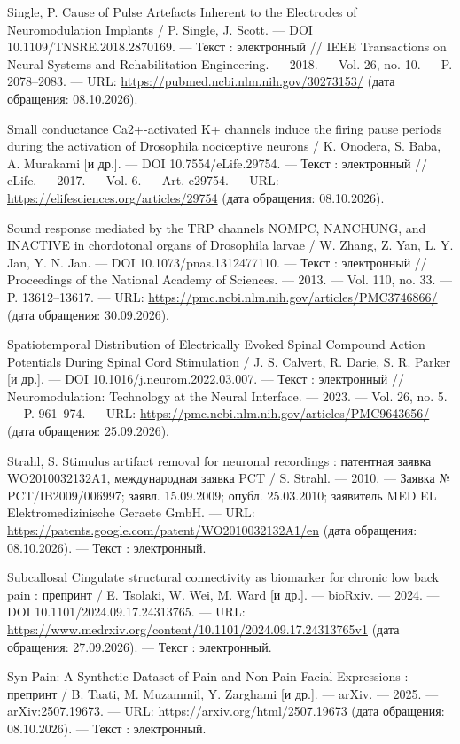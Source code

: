 \begin{list}{}{\setlength{\leftmargin}{10mm}\setlength{\labelwidth}{8mm}\setlength{\labelsep}{2mm}\setlength{\itemsep}{0pt}\setlength{\parsep}{0pt}\setlength{\topsep}{0pt}}
\item[255.] Single, P. Cause of Pulse Artefacts Inherent to the Electrodes of Neuromodulation Implants / P. Single, J. Scott. — DOI 10.1109/TNSRE.2018.2870169. — Текст : электронный // IEEE Transactions on Neural Systems and Rehabilitation Engineering. — 2018. — Vol. 26, no. 10. — P. 2078–2083. — URL: \url{https://pubmed.ncbi.nlm.nih.gov/30273153/} (дата обращения: 08.10.2026).
\item[256.] Small conductance Ca2+-activated K+ channels induce the firing pause periods during the activation of Drosophila nociceptive neurons / K. Onodera, S. Baba, A. Murakami [и др.]. — DOI 10.7554/eLife.29754. — Текст : электронный // eLife. — 2017. — Vol. 6. — Art. e29754. — URL: \url{https://elifesciences.org/articles/29754} (дата обращения: 08.10.2026).
\item[257.] Sound response mediated by the TRP channels NOMPC, NANCHUNG, and INACTIVE in chordotonal organs of Drosophila larvae / W. Zhang, Z. Yan, L. Y. Jan, Y. N. Jan. — DOI 10.1073/pnas.1312477110. — Текст : электронный // Proceedings of the National Academy of Sciences. — 2013. — Vol. 110, no. 33. — P. 13612–13617. — URL: \url{https://pmc.ncbi.nlm.nih.gov/articles/PMC3746866/} (дата обращения: 30.09.2026).
\item[258.] Spatiotemporal Distribution of Electrically Evoked Spinal Compound Action Potentials During Spinal Cord Stimulation / J. S. Calvert, R. Darie, S. R. Parker [и др.]. — DOI 10.1016/j.neurom.2022.03.007. — Текст : электронный // Neuromodulation: Technology at the Neural Interface. — 2023. — Vol. 26, no. 5. — P. 961–974. — URL: \url{https://pmc.ncbi.nlm.nih.gov/articles/PMC9643656/} (дата обращения: 25.09.2026).
\item[259.] Strahl, S. Stimulus artifact removal for neuronal recordings : патентная заявка WO2010032132A1, международная заявка PCT / S. Strahl. — 2010. — Заявка № PCT/IB2009/006997; заявл. 15.09.2009; опубл. 25.03.2010; заявитель MED EL Elektromedizinische Geraete GmbH. — URL: \url{https://patents.google.com/patent/WO2010032132A1/en} (дата обращения: 08.10.2026). — Текст : электронный.
\item[260.] Subcallosal Cingulate structural connectivity as biomarker for chronic low back pain : препринт / E. Tsolaki, W. Wei, M. Ward [и др.]. — bioRxiv. — 2024. — DOI 10.1101/2024.09.17.24313765. — URL: \url{https://www.medrxiv.org/content/10.1101/2024.09.17.24313765v1} (дата обращения: 27.09.2026). — Текст : электронный.
\item[261.] Syn Pain: A Synthetic Dataset of Pain and Non-Pain Facial Expressions : препринт / B. Taati, M. Muzammil, Y. Zarghami [и др.]. — arXiv. — 2025. — arXiv:2507.19673. — URL: \url{https://arxiv.org/html/2507.19673} (дата обращения: 08.10.2026). — Текст : электронный.

\end{list}
